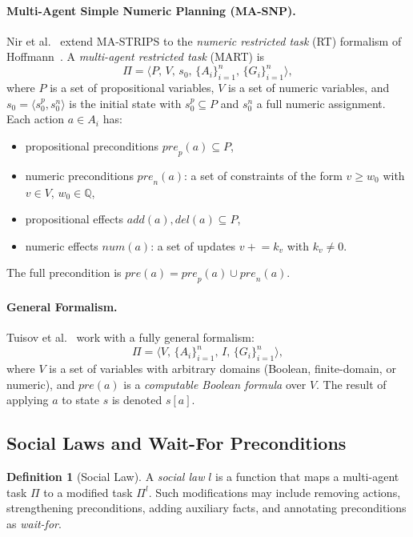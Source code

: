 \documentclass{article}
\theoremstyle{definition}
\newtheorem{definition}{Definition}
\newcommand{\pre}{\mathit{pre}}
\newcommand{\add}{\mathit{add}}
\newcommand{\del}{\mathit{del}}
\newcommand{\num}{\mathit{num}}
\begin{document}
\paragraph{Multi-Agent Simple Numeric Planning (MA-SNP).}
Nir et al.~\cite{nir2023} extend MA-STRIPS to the \emph{numeric restricted task} (RT) formalism of Hoffmann~\cite{hoffmann2003}. A \emph{multi-agent restricted task} (MART) is
\[
  \Pi = \langle P,\, V,\, s_0,\, \{A_i\}_{i=1}^n,\, \{G_i\}_{i=1}^n \rangle,
\]
where $P$ is a set of propositional variables, $V$ is a set of numeric variables, and $s_0 = \langle s_0^p, s_0^n \rangle$ is the initial state with $s_0^p \subseteq P$ and $s_0^n$ a full numeric assignment. Each action $a \in A_i$ has:
\begin{itemize}
  \item propositional preconditions $\mathit{pre}_p(a) \subseteq P$,
  \item numeric preconditions $\mathit{pre}_n(a)$: a set of constraints of the form $v \geq w_0$ with $v \in V$, $w_0 \in \mathbb{Q}$,
  \item propositional effects $\add(a), \del(a) \subseteq P$,
  \item numeric effects $\num(a)$: a set of updates $v \mathrel{+}= k_v$ with $k_v \neq 0$.
\end{itemize}
The full precondition is $\pre(a) = \mathit{pre}_p(a) \cup \mathit{pre}_n(a)$.

\paragraph{General Formalism.}
Tuisov et al.~\cite{tuisov2025} work with a fully general formalism:
\[
  \Pi = \langle V,\, \{A_i\}_{i=1}^n,\, I,\, \{G_i\}_{i=1}^n \rangle,
\]
where $V$ is a set of variables with arbitrary domains (Boolean, finite-domain, or numeric), and $\pre(a)$ is a \emph{computable Boolean formula} over $V$. The result of applying $a$ to state $s$ is denoted $s[a]$.

\subsection{Social Laws and Wait-For Preconditions}

\begin{definition}[Social Law]
A \emph{social law} $l$ is a function that maps a multi-agent task $\Pi$ to a modified task $\Pi^l$. Such modifications may include removing actions, strengthening preconditions, adding auxiliary facts, and annotating preconditions as \emph{wait-for}.
\end{definition}
\end{document}
